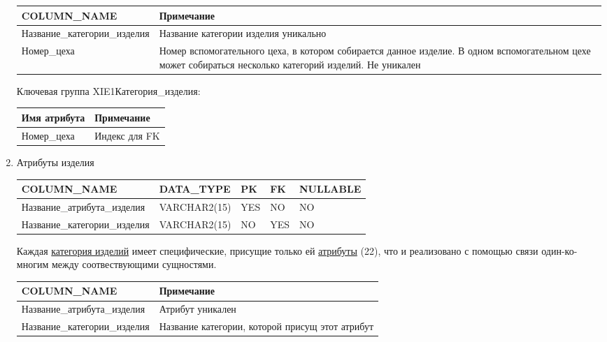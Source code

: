 \begin{enumerate}
\begin{tabular}{|p{4cm}|p{5cm}|}
        {\bf COLUMN\_NAME} & {\bf Примечание} \\ \hline
        Название\_категории\_изделия & Название категории изделия уникально \\ \hline
        Номер\_цеха & Номер вспомогательного цеха, в котором собирается данное изделие. В одном вспомогательном цехе может собираться несколько категорий изделий. Не уникален \\ \hline

    \end{tabular}

    Ключевая группа XIE1Категория\_изделия:

    \begin{tabular}{|p{4cm}|p{5cm}|} \hline

        {\bf Имя атрибута} & {\bf Примечание} \\ \hline
        Номер\_цеха & Индекс для FK \\ \hline

    \end{tabular}

    \item{Атрибуты изделия}

    \begin{tabular}{|p{4cm}|p{3cm}|p{1cm}|p{1cm}|p{2cm}|} \hline

        {\bf COLUMN\_NAME} & {\bf DATA\_TYPE} & {\bf PK} & {\bf FK} & {\bf NULLABLE} \\ \hline
        Название\_атрибута\_изделия & VARCHAR2(15) & YES & NO & NO \\ \hline
        Название\_категории\_изделия & VARCHAR2(15) & NO & YES & NO \\ \hline

    \end{tabular}

    Каждая \underline{категория изделий} имеет специфические, присущие только ей \underline{атрибуты} (22), что и реализовано с помощью связи один-ко-многим между соотвествующими сущностями.

    \begin{tabular}{|p{4cm}|p{5cm}|} \hline

        {\bf COLUMN\_NAME} & {\bf Примечание} \\ \hline
        Название\_атрибута\_изделия & Атрибут уникален \\ \hline
        Название\_категории\_изделия & Название категории, которой присущ этот атрибут \\ \hline


\end{tabular}
\end{enumerate}
